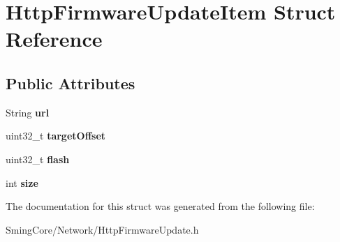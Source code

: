 \hypertarget{struct_http_firmware_update_item}{}\section{Http\+Firmware\+Update\+Item Struct Reference}
\label{struct_http_firmware_update_item}
\subsection*{Public Attributes}
\begin{DoxyCompactItemize}
\item 
\hypertarget{struct_http_firmware_update_item_a0d5a9f9ff25c356685303c1f79634840}{}String {\bfseries url}\label{struct_http_firmware_update_item_a0d5a9f9ff25c356685303c1f79634840}

\item 
\hypertarget{struct_http_firmware_update_item_a0f5c54f7221fbfbebe94a67b659e166a}{}uint32\+\_\+t {\bfseries target\+Offset}\label{struct_http_firmware_update_item_a0f5c54f7221fbfbebe94a67b659e166a}

\item 
\hypertarget{struct_http_firmware_update_item_aaf6051dbec373d4bfe116b7d25497f74}{}uint32\+\_\+t {\bfseries flash}\label{struct_http_firmware_update_item_aaf6051dbec373d4bfe116b7d25497f74}

\item 
\hypertarget{struct_http_firmware_update_item_af546c18fb8e76c1c11e283b78527bed2}{}int {\bfseries size}\label{struct_http_firmware_update_item_af546c18fb8e76c1c11e283b78527bed2}

\end{DoxyCompactItemize}


The documentation for this struct was generated from the following file\+:\begin{DoxyCompactItemize}
\item 
Sming\+Core/\+Network/Http\+Firmware\+Update.\+h\end{DoxyCompactItemize}
